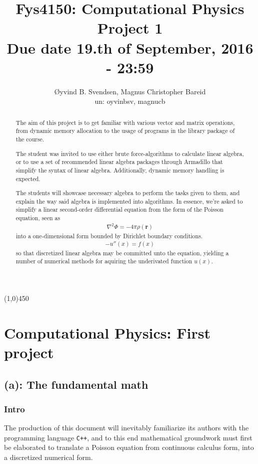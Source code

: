 \documentclass[11pt,a4paper,notitlepage]{article}
\title{\normalsize Fys4150: Computational Physics \\
\vspace{10mm}
\huge Project 1\\
\vspace{10mm}
\normalsize Due date {\bf 19.th of September, 2016 - 23:59}}
\author{Øyvind B. Svendsen, Magnus Christopher Bareid \\ un: oyvinbsv, magnucb}
\begin{document}
\noindent
\maketitle
\vspace{10mm}
\begin{abstract}
The aim of this project is to get familiar with various vector and matrix operations, from dynamic memory allocation to the usage of programs in the library package of the course.

The student was invited to use either brute force-algorithms to calculate linear algebra, or to use a set of recommended linear algebra packages through Armadillo that simplify the syntax of linear algebra. Additionally, dynamic memory handling is expected.

The students will showcase necessary algebra to perform the tasks given to them, and explain the way said algebra is implemented into algorithms. In essence, we're asked to simplify a linear second-order differential equation from the form of the Poisson equation, seen as
\begin{align*}
\nabla ^2 \Phi = -4\pi\rho(\mathbf{r})
\end{align*}
into a one-dimensional form bounded by Dirichlet boundary conditions.
\begin{align*}
-u''(x) = f(x)
\end{align*}
so that discretized linear algebra may be committed unto the equation, yielding a number of numerical methods for aquiring the underivated function $u(x)$.
\end{abstract}
\begin{center}
\line(1,0){450}
\end{center}

\newpage
\tableofcontents

\newpage
\section{Computational Physics: First project}
\subsection{(a): The fundamental math}
\subsubsection{Intro}
The production of this document will inevitably familiarize its authors with the programming language \verb|C++|, and to this end mathematical groundwork must first be elaborated to translate a Poisson equation from continuous calculus form, into a discretized numerical form.
\end{document}
